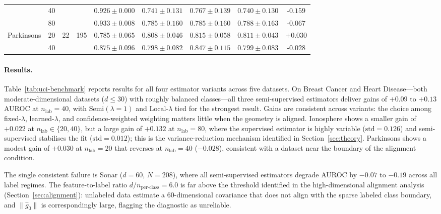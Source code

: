 \documentclass[11pt]{article}
\theoremstyle{definition}
\begin{document}
\begin{table}[t]
\begin{tabular}{llrr cccc c}
  & 40 & & & $0.926\pm0.000$ & $0.741\pm0.131$ & $0.767\pm0.139$ & $0.740\pm0.130$ & $\textit{-0.159}$ \\
  & 80 & & & $0.933\pm0.008$ & $0.785\pm0.160$ & $0.785\pm0.160$ & $0.788\pm0.163$ & $\textit{-0.067}$ \\
\hline
\multirow{2}{*}{Parkinsons}
  & 20 & \multirow{2}{*}{22} & \multirow{2}{*}{195}
      & $0.785\pm0.065$ & $0.808\pm0.046$ & $0.815\pm0.058$ & $0.811\pm0.043$ & $+0.030$ \\
  & 40 & & & $0.875\pm0.096$ & $0.798\pm0.082$ & $0.847\pm0.115$ & $0.799\pm0.083$ & $\textit{-0.028}$ \\
\hline
\end{tabular}
\end{table}

\paragraph{Results.}
Table~\ref{tab:uci-benchmark} reports results for all four estimator variants
across five datasets.
On Breast Cancer and Heart Disease---both moderate-dimensional datasets
($d \leq 30$) with roughly balanced classes---all three semi-supervised
estimators deliver gains of $+0.09$ to $+0.13$ AUROC at $n_{\text{lab}}=40$,
with $\text{Semi}(\lambda{=}1)$ and $\text{Local-}\lambda$ tied for the strongest result.
Gains are consistent across variants: the choice among fixed-$\lambda$,
learned-$\lambda$, and confidence-weighted weighting matters little when the
geometry is aligned.
Ionosphere shows a smaller gain of $+0.022$ at $n_{\text{lab}} \in \{20,40\}$,
but a large gain of $+0.132$ at $n_{\text{lab}}=80$, where the supervised
estimator is highly variable ($\text{std}=0.126$) and semi-supervised
stabilises the fit ($\text{std}=0.012$); this is the variance-reduction
mechanism identified in Section~\ref{sec:theory}.
Parkinsons shows a modest gain of $+0.030$ at $n_{\text{lab}}=20$ that reverses
at $n_{\text{lab}}=40$ ($-0.028$), consistent with a dataset near the boundary
of the alignment condition.

The single consistent failure is Sonar ($d=60$, $N=208$), where all
semi-supervised estimators degrade AUROC by $-0.07$ to $-0.19$ across all
label regimes.
The feature-to-label ratio $d/n_{\text{per-class}} = 6.0$ is far above the
threshold identified in the high-dimensional alignment analysis
(Section~\ref{sec:alignment}): unlabeled data estimate a 60-dimensional
covariance that does not align with the sparse labeled class boundary, and
$\|\hat{g}_0\|$ is correspondingly large, flagging the diagnostic as unreliable.
\end{document}
